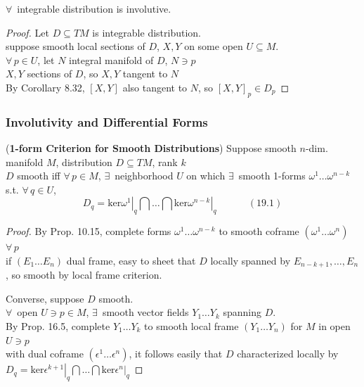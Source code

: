 \begin{proposition}[19.3] $\forall \, $ integrable distribution is involutive. \end{proposition}

\begin{proof} Let $D \subseteq TM$ is integrable distribution. \\
suppose smooth local sections of $D$, $X,Y$ on some open $U\subseteq M$. \\
$\forall \, p \in U$, let $N$ integral manifold of $D$, $N \ni p$ \\
$X,Y$ sections of $D$, so $X,Y$ tangent to $N$ \\
By Corollary 8.32, $[X,Y]$ also tangent to $N$, so $[X,Y]_p \in D_p$
\end{proof}



\subsubsection*{Involutivity and Differential Forms}

\begin{lemma}[19.5] (\textbf{1-form Criterion for Smooth Distributions}) Suppose smooth $n$-dim. manifold $M$, distribution $D \subseteq TM$, rank $k$  \\ 
$D$ smooth iff $\forall \, p \in M$, $\exists \, $ neighborhood $U$ on which $\exists \, $ smooth 1-forms $\omega^1 \dots \omega^{n-k}$ s.t. $\forall \, q \in U$, 
\begin{equation}
  D_q = \text{ker} \left. \omega^1 \right|_q \bigcap \dots \bigcap \left. \text{ker} \omega^{n-k} \right|_q  \quad \quad \quad \, (19.1)
\end{equation}
\end{lemma}
 \begin{proof}
By Prop. 10.15, complete forms $\omega^1 \dots \omega^{n-k}$ to smooth coframe $(\omega^1 \dots \omega^n)$ \quad \, $\forall \, p$ \\
if $(E_1 \dots E_n)$ dual frame, easy to sheet that $D$ locally spanned by $E_{n-k+1 }, \dots , E_n$, so smooth by local frame criterion.  

Converse, suppose $D$ smooth. \\
$\forall \, $ open $U \ni p \in M$, $\exists \, $ smooth vector fields $Y_1 \dots Y_k$ spanning $D$. \\
By Prop. 16.5, complete $Y_1 \dots Y_k$ to smooth local frame $(Y_1 \dots Y_n)$ for $M$ in open $U\ni p$ \\
with dual coframe $(\epsilon^1 \dots \epsilon^n)$, it follows easily that $D$ characterized locally by $D_q = \text{ker} \left. \epsilon^{k+1} \right|_q \bigcap \dots \bigcap \text{ker} \left. \epsilon^n \right|_q$ 

\end{proof}


